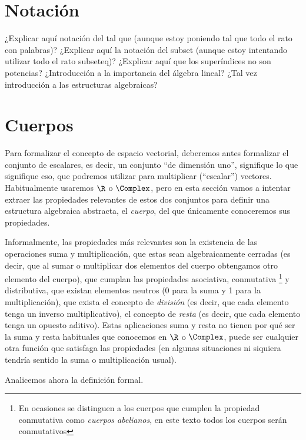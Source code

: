 \documentclass[../algebra_lineal.tex]{subfiles}
\begin{document}
\section{Notación}

¿Explicar aquí notación del tal que (aunque estoy poniendo tal que todo el rato con palabras)? ¿Explicar aquí la notación del subset (aunque estoy intentando utilizar todo el rato subseteq)? ¿Explicar aquí que los superíndices no son potencias? ¿Introducción a la importancia del álgebra lineal? ¿Tal vez introducción a las estructuras algebraicas?

\section{Cuerpos}

Para formalizar el concepto de espacio vectorial, deberemos antes formalizar el conjunto de escalares, es decir, un conjunto ``de dimensión uno'', signifique lo que signifique eso, que podremos utilizar para multiplicar (``escalar'') vectores. Habitualmente usaremos $\R$ o $\Complex$, pero en esta sección vamos a intentar extraer las propiedades relevantes de estos dos conjuntos para definir una estructura algebraica abstracta, el \textit{cuerpo}, del que únicamente conoceremos sus propiedades.

Informalmente, las propiedades más relevantes son la existencia de las operaciones suma y multiplicación, que estas sean algebraicamente cerradas
(es decir, que al sumar o multiplicar dos elementos del cuerpo obtengamos otro elemento del cuerpo), que cumplan las propiedades asociativa, conmutativa
\footnote{En ocasiones se distinguen a los cuerpos que cumplen la propiedad conmutativa como \textit{cuerpos abelianos}, en este texto todos los cuerpos
 serán conmutativos} y distributiva, que existan elementos neutros (0 para la suma y 1 para la multiplicación), que exista el concepto de \textit{división} (es decir, que cada elemento tenga un inverso multiplicativo), el concepto de \textit{resta} (es decir, que cada elemento tenga un opuesto aditivo). Estas aplicaciones suma y resta no tienen por qué ser la suma y resta habituales que conocemos en $\R$ o $\Complex$, puede ser cualquier otra función que satisfaga las propiedades (en algunas situaciones ni siquiera tendría sentido la suma o multiplicación usual).

Analicemos ahora la definición formal.
\end{document}

